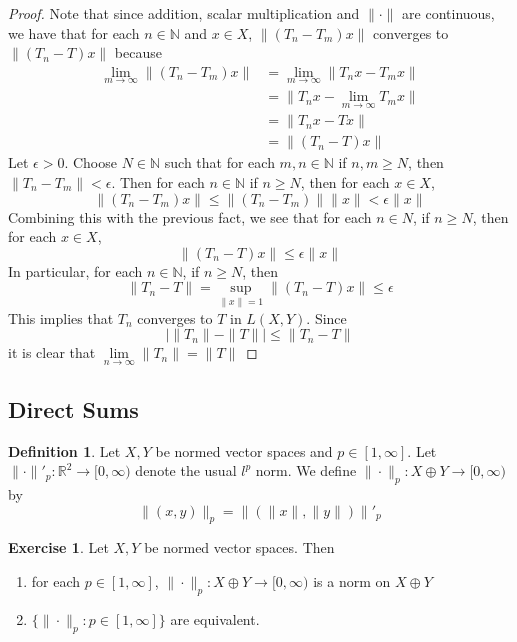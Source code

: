 \documentclass[12pt]{amsart}
\theoremstyle{definition}
\newtheorem{defn}[definition]{Definition}
\newtheorem{ex}[definition]{Exercise}
\newcommand{\ep}{\epsilon}
\newcommand{\N}{\mathbb{N}}
\newcommand{\R}{\mathbb{R}}
\newcommand{\Rg}{[0,\infty)}
\newcommand{\limn}{\lim \limits_{n \rightarrow \infty}}
\DeclareMathOperator*{\0}{\mbf{0}}
\DeclareMathOperator*{\1}{\mbf{1}}
\newcommand{\lex}[1]{\label{ex:#1}}
\newcommand{\ld}[1]{\label{defn:#1}}
\begin{document}
\begin{proof}
		Note that since addition, scalar multiplication and $\|\cdot \|$ are continuous, we have that for each $n \in \N$ and $x \in X$, $\|(T_n-T_m)x \|$ converges to $\|(T_n-T)x \|$ because 
		\begin{align*}
			\lim_{m \rightarrow \infty} \|(T_n-T_m)x \|
			&= \lim_{m \rightarrow \infty} \|T_nx-T_mx \|\\
			&= \|T_nx-\lim_{m \rightarrow \infty}T_mx \|\\
			&=\|T_nx-Tx \|\\
			&= \|(T_n-T)x \|
		\end{align*} 
		Let $\ep >0 $. Choose $N \in \N$ such that for each $m, n \in \N$ if $n,m \geq N$, then $\|T_n - T_m \|< \ep$. Then for each $n \in \N$ if $n \geq N$, then for each $x \in X$, $$\|(T_n-T_m)x\|\leq \|(T_n-T_m)\|\|x \|< \ep \|x\|$$ Combining this with the previous fact, we see that for each $n \in N$, if $n \geq N$, then for each $x \in X$, $$\|(T_n -T) x\|\leq \ep \|x \|$$ In particular, for each $n \in \N$, if $n \geq N$, then $$ \|T_n -T \|= \sup\limits_{\|x \|= 1}\|(T_n - T)x \|\leq \ep$$ This implies that $T_n$ converges to $T$ in $L(X,Y)$. 
		Since $$\bigg | \|T_n \|- \|T \|\bigg | \leq \|T_n - T \|$$ it is clear that $\limn \|T_n \|= \|T \|$
	\end{proof}
	
	
	
	
	
	
	
	
	
	
	
	
	
	
	
	
	
	
	
	
	
	
	
	
	\newpage
	\subsection{Direct Sums}
	
	\begin{defn} \ld{}
	Let $X, Y$ be normed vector spaces and $p \in [1, \infty]$. Let $\| \cdot \|'_p: \R^2 \rightarrow [0, \infty)$ denote the usual $l^p$ norm. We define $\| \cdot \|_p : X \oplus Y \rightarrow \Rg$ by $$\|(x, y) \|_p = \|( \|x\|, \| y \|) \|'_ p$$
	\end{defn}
	
	\begin{ex} \lex{}	
	Let $X, Y$  be normed vector spaces. Then 
	\begin{enumerate}
	\item for each $p \in [1, \infty]$, $\|\cdot\|_p: X \oplus Y \rightarrow \Rg$ is a norm on $X \oplus Y$
	\item  $\{\|\cdot \|_p:  p \in [1, \infty]\}$ are equivalent. 
	\end{enumerate}
	\end{ex}
	
\end{document}
